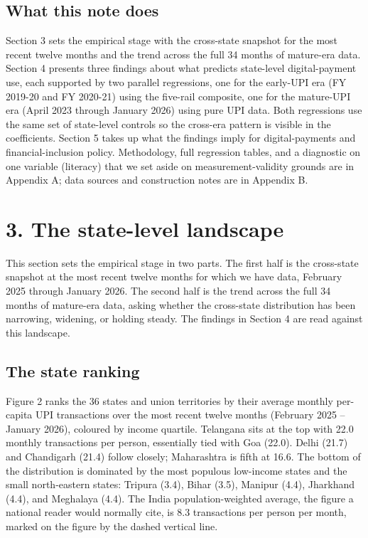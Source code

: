 \documentclass[
]{article}
\begin{document}
\subsection{What this note does}\label{what-this-note-does}

Section 3 sets the empirical stage with the cross-state snapshot for the
most recent twelve months and the trend across the full 34 months of
mature-era data. Section 4 presents three findings about what predicts
state-level digital-payment use, each supported by two parallel
regressions, one for the early-UPI era (FY 2019-20 and FY 2020-21) using
the five-rail composite, one for the mature-UPI era (April 2023 through
January 2026) using pure UPI data. Both regressions use the same set of
state-level controls so the cross-era pattern is visible in the
coefficients. Section 5 takes up what the findings imply for
digital-payments and financial-inclusion policy. Methodology, full
regression tables, and a diagnostic on one variable (literacy) that we
set aside on measurement-validity grounds are in Appendix A; data
sources and construction notes are in Appendix B.

\section{3. The state-level landscape}\label{the-state-level-landscape}

This section sets the empirical stage in two parts. The first half is
the cross-state snapshot at the most recent twelve months for which we
have data, February 2025 through January 2026. The second half is the
trend across the full 34 months of mature-era data, asking whether the
cross-state distribution has been narrowing, widening, or holding
steady. The findings in Section 4 are read against this landscape.

\subsection{The state ranking}\label{the-state-ranking}

Figure 2 ranks the 36 states and union territories by their average
monthly per-capita UPI transactions over the most recent twelve months
(February 2025 -- January 2026), coloured by income quartile. Telangana
sits at the top with 22.0 monthly transactions per person, essentially
tied with Goa (22.0). Delhi (21.7) and Chandigarh (21.4) follow closely;
Maharashtra is fifth at 16.6. The bottom of the distribution is
dominated by the most populous low-income states and the small
north-eastern states: Tripura (3.4), Bihar (3.5), Manipur (4.4),
Jharkhand (4.4), and Meghalaya (4.4). The India population-weighted
average, the figure a national reader would normally cite, is 8.3
transactions per person per month, marked on the figure by the dashed
vertical line.
\end{document}
